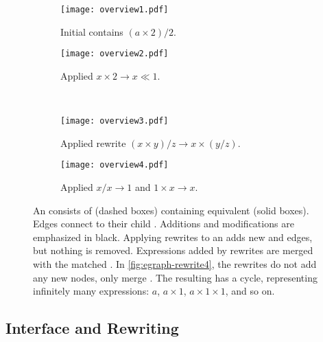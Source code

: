 \begin{figure}
  \begin{subfigure}[t]{0.45\linewidth}
    \centering
    \texttt{[image: overview1.pdf]}
    \caption{Initial \egraph contains ${(a \times 2) / 2}$.}
    \label{fig:egraph-rewrite1}
  \end{subfigure}
  \hfill
  \begin{subfigure}[t]{0.45\linewidth}
    \centering
    \texttt{[image: overview2.pdf]}
    \caption{
      Applied ${x \times 2 \to x \ll 1}$.
    }\label{fig:egraph-rewrite2}
  \end{subfigure}
  \\[1em]
  \begin{subfigure}[t]{0.45\linewidth}
    \centering
    \texttt{[image: overview3.pdf]}
    \caption{
      Applied rewrite ${(x \times y) / z \to x \times (y / z)}$.
    }\label{fig:egraph-rewrite3}
  \end{subfigure}
  \hfill
  \begin{subfigure}[t]{0.45\linewidth}
    \centering
    \texttt{[image: overview4.pdf]}
    \caption{
      Applied ${x / x \to 1}$ and ${1 \times x \to x}$.
    }\label{fig:egraph-rewrite4}
  \end{subfigure}
  \caption{
    An \egraph consists of \eclasses (dashed boxes) containing
      equivalent \enodes (solid boxes).
    Edges connect \enodes to their child \eclasses.
    Additions and modifications are emphasized in black.
    Applying rewrites to an \egraph adds new \enodes and edges,
      but nothing is removed.
    Expressions added by rewrites are merged with the matched \eclass.
    In \autoref{fig:egraph-rewrite4}, the rewrites do not add any new nodes,
      only merge \eclasses.
    The resulting \egraph has a cycle,
      representing infinitely many expressions:
      $a$, $a \times 1$, $a \times 1 \times 1$, and so on.
  }
  \label{fig:egraph-rewrite}
\end{figure}

\subsection{Interface and Rewriting}
\label{sec:interface}

